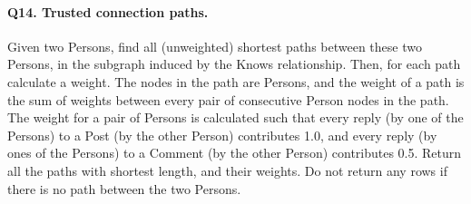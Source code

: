 \paragraph{\textbf{Q14}. Trusted connection paths.}
Given two Persons, find all (unweighted) shortest paths between these
two Persons, in the subgraph induced by the Knows relationship. Then,
for each path calculate a weight. The nodes in the path are Persons, and
the weight of a path is the sum of weights between every pair of
consecutive Person nodes in the path. The weight for a pair of Persons
is calculated such that every reply (by one of the Persons) to a Post
(by the other Person) contributes 1.0, and every reply (by ones of the
Persons) to a Comment (by the other Person) contributes 0.5. Return all
the paths with shortest length, and their weights. Do not return any
rows if there is no path between the two Persons.
